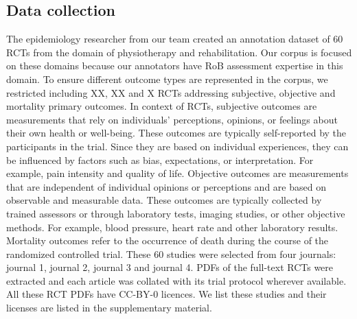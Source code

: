 \documentclass[sn-mathphys,Numbered]{sn-jnl}%
\theoremstyle{thmstyleone}%
\theoremstyle{thmstyletwo}%
\theoremstyle{thmstylethree}%
\begin{document}
\subsection{Data collection}
\label{data}
%
The epidemiology researcher from our team created an annotation dataset of 60 RCTs from the domain of physiotherapy and rehabilitation.
Our corpus is focused on these domains because our annotators have RoB assessment expertise in this domain.
To ensure different outcome types are represented in the corpus, we restricted including XX, XX and X RCTs addressing subjective, objective and mortality primary outcomes.
In context of RCTs, subjective outcomes are measurements that rely on individuals' perceptions, opinions, or feelings about their own health or well-being.
These outcomes are typically self-reported by the participants in the trial.
Since they are based on individual experiences, they can be influenced by factors such as bias, expectations, or interpretation.
For example, pain intensity and quality of life.
Objective outcomes are measurements that are independent of individual opinions or perceptions and are based on observable and measurable data.
These outcomes are typically collected by trained assessors or through laboratory tests, imaging studies, or other objective methods.
For example, blood pressure, heart rate and other laboratory results.
Mortality outcomes refer to the occurrence of death during the course of the randomized controlled trial. 
These 60 studies were selected from four journals: journal 1, journal 2, journal 3 and journal 4. 
PDFs of the full-text RCTs were extracted and each article was collated with its trial protocol wherever available.
All these RCT PDFs have CC-BY-0 licences.
We list these studies and their licenses are listed in the supplementary material.


%
%
%
\end{document}
